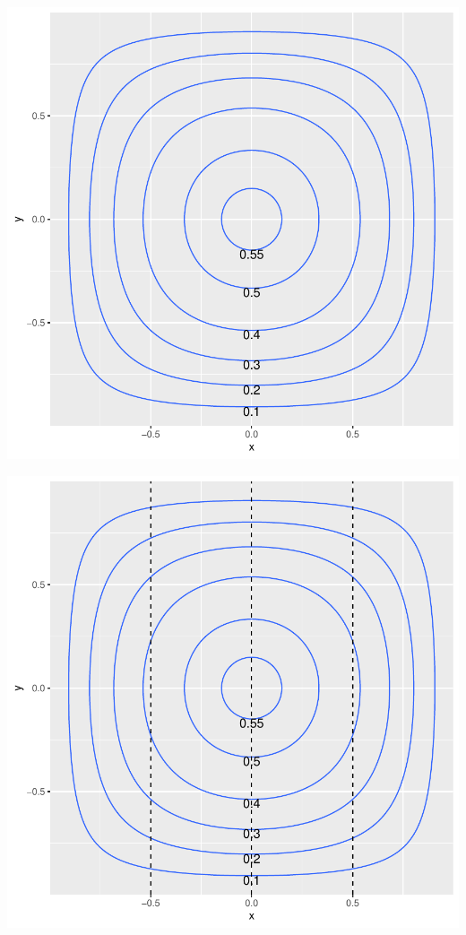 \begin{frame}
  \begin{block}{\examplectd}
    \begin{center}
      \includegraphics[height = .7\textheight]{figure/example2-1}
    \end{center}
  \end{block}
\end{frame}

\begin{frame}
  \begin{block}{\examplectd}
    \begin{center}
      \includegraphics[height = .7\textheight]{figure/example2-2}
    \end{center}
  \end{block}
\end{frame}

